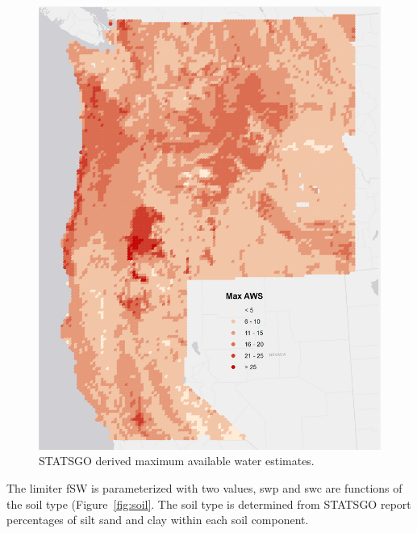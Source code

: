\documentclass[preprint,12pt]{elsarticle}
\begin{document}
\begin{figure}
  \centering
\includegraphics{maxaws}
  \caption{\ac{STATSGO} derived maximum available water estimates. }
  \label{fig:aws}
\end{figure}

The limiter \ac{fSW} is parameterized with two values, \ac{swp} and
\ac{swc} are functions of the soil type (Figure~\ref{fig:soil}.  The
soil type is determined from \ac{STATSGO} report  percentages of
silt sand and clay within each soil component.

\end{document}
